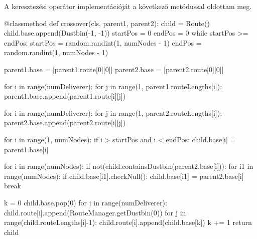 A keresztezési operátor implementációját a következő metódussal oldottam meg.
\begin{python}
@classmethod
def crossover(cls, parent1, parent2):
    child = Route()
    child.base.append(Dustbin(-1, -1))
    startPos = 0
    endPos = 0
    while startPos >= endPos:
        startPos = random.randint(1, numNodes - 1)
        endPos = random.randint(1, numNodes - 1)

    parent1.base = [parent1.route[0][0]]
    parent2.base = [parent2.route[0][0]]

    for i in range(numDeliverer):
        for j in range(1, parent1.routeLengths[i]):
            parent1.base.append(parent1.route[i][j])

    for i in range(numDeliverer):
        for j in range(1, parent2.routeLengths[i]):
            parent2.base.append(parent2.route[i][j])

    for i in range(1, numNodes):
        if i > startPos and i < endPos:
            child.base[i] = parent1.base[i]

    for i in range(numNodes):
        if not(child.containsDustbin(parent2.base[i])):
            for i1 in range(numNodes):
                if child.base[i1].checkNull():
                    child.base[i1] =  parent2.base[i]
                    break

    k = 0
    child.base.pop(0)
    for i in range(numDeliverer):
        child.route[i].append(RouteManager.getDustbin(0))
        for j in range(child.routeLengths[i]-1):
            child.route[i].append(child.base[k])
            k += 1
    return child
\end{python}

